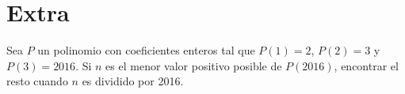 \section{Extra}

\begin{section-problem}
    Sea $P$ un polinomio con coeficientes enteros tal que $P(1) = 2$, $P(2) = 3$ y $P(3) = 2016$.
    Si $n$ es el menor valor positivo posible de $P(2016)$, encontrar el resto cuando $n$ es dividido por 2016.
\end{section-problem}
